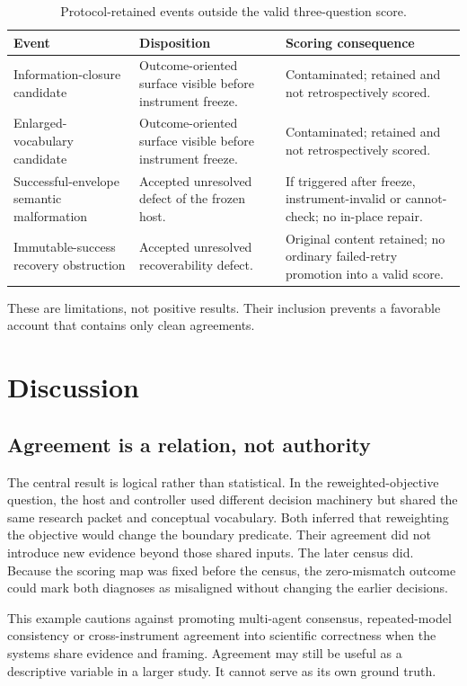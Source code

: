\documentclass[10pt]{article}
\begin{document}
\begin{table}[t]
\centering
\caption{Protocol-retained events outside the valid three-question score.}
\label{tab:retained}
\small
\begin{tabularx}{\textwidth}{@{}p{}YY@{}}
\toprule
Event & Disposition & Scoring consequence \\
\midrule
Information-closure candidate & Outcome-oriented surface visible before instrument freeze. & Contaminated; retained and not retrospectively scored. \\
Enlarged-vocabulary candidate & Outcome-oriented surface visible before instrument freeze. & Contaminated; retained and not retrospectively scored. \\
Successful-envelope semantic malformation & Accepted unresolved defect of the frozen host. & If triggered after freeze, instrument-invalid or cannot-check; no in-place repair. \\
Immutable-success recovery obstruction & Accepted unresolved recoverability defect. & Original content retained; no ordinary failed-retry promotion into a valid score. \\
\bottomrule
\end{tabularx}
\end{table}

These are limitations, not positive results. Their inclusion prevents a favorable account that contains only clean agreements.

\section{Discussion}

\subsection{Agreement is a relation, not authority}

The central result is logical rather than statistical. In the reweighted-objective question, the host and controller used different decision machinery but shared the same research packet and conceptual vocabulary. Both inferred that reweighting the objective would change the boundary predicate. Their agreement did not introduce new evidence beyond those shared inputs. The later census did. Because the scoring map was fixed before the census, the zero-mismatch outcome could mark both diagnoses as misaligned without changing the earlier decisions.

This example cautions against promoting multi-agent consensus, repeated-model consistency or cross-instrument agreement into scientific correctness when the systems share evidence and framing. Agreement may still be useful as a descriptive variable in a larger study. It cannot serve as its own ground truth.
\end{document}
